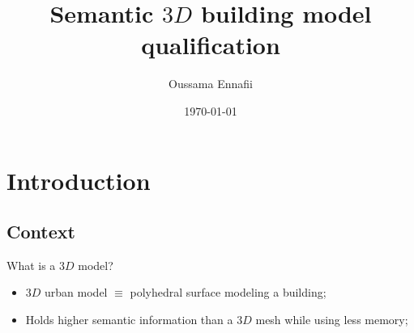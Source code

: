 \documentclass{beamer}
\title{Semantic $3D$ building model qualification}
\subtitle{}
\institute[LaSTIG MATIS]{Univ. Paris Est, LaSTIG MATIS, IGN, ENSG}
\date{\today}
\author[O.Ennafii]{Oussama Ennafii}
\begin{document}
    \begin{frame}[plain]
        \titlepage{}
    \end{frame}

    \section{Introduction}
        \subsection{Context}
            \begin{frame}{What is a $3D$ model?}
                \begin{itemize}[label=$\blacktriangleright$, font=\color{IGNGreen}]
                    \item<1-> $3D$ urban model $\equiv$ polyhedral surface modeling a building;
                    \item<2-> Holds higher semantic information than a $3D$ mesh while using less memory;
                \end{itemize}
            \end{frame}
\end{document}
